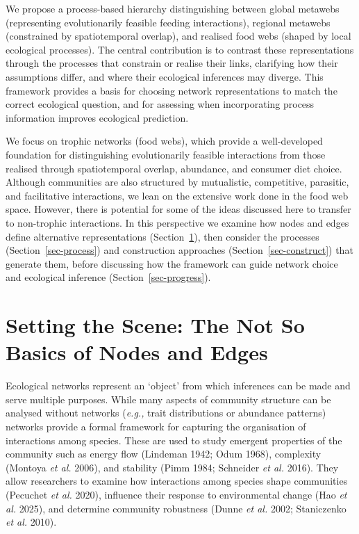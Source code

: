 \documentclass[
]{article}
\begin{document}
We propose a process-based hierarchy distinguishing between global
metawebs (representing evolutionarily feasible feeding interactions),
regional metawebs (constrained by spatiotemporal overlap), and realised
food webs (shaped by local ecological processes). The central
contribution is to contrast these representations through the processes
that constrain or realise their links, clarifying how their assumptions
differ, and where their ecological inferences may diverge. This
framework provides a basis for choosing network representations to match
the correct ecological question, and for assessing when incorporating
process information improves ecological prediction.

We focus on trophic networks (food webs), which provide a well-developed
foundation for distinguishing evolutionarily feasible interactions from
those realised through spatiotemporal overlap, abundance, and consumer
diet choice. Although communities are also structured by mutualistic,
competitive, parasitic, and facilitative interactions, we lean on the
extensive work done in the food web space. However, there is potential
for some of the ideas discussed here to transfer to non-trophic
interactions. In this perspective we examine how nodes and edges define
alternative representations (Section~\ref{sec-anatomy}), then consider
the processes (Section~\ref{sec-process}) and construction approaches
(Section~\ref{sec-construct}) that generate them, before discussing how
the framework can guide network choice and ecological inference
(Section~\ref{sec-progress}).

\section{Setting the Scene: The Not So Basics of Nodes and
Edges}\label{sec-anatomy}

Ecological networks represent an `object' from which inferences can be
made and serve multiple purposes. While many aspects of community
structure can be analysed without networks (\emph{e.g.,} trait
distributions or abundance patterns) networks provide a formal framework
for capturing the organisation of interactions among species. These are
used to study emergent properties of the community such as energy flow
(Lindeman 1942; Odum 1968), complexity (Montoya \emph{et al.} 2006), and
stability (Pimm 1984; Schneider \emph{et al.} 2016). They allow
researchers to examine how interactions among species shape communities
(Pecuchet \emph{et al.} 2020), influence their response to environmental
change (Hao \emph{et al.} 2025), and determine community robustness
(Dunne \emph{et al.} 2002; Staniczenko \emph{et al.} 2010).
\end{document}
